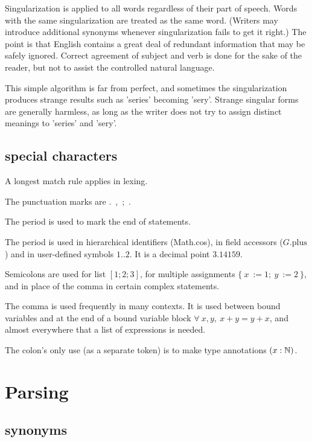 \documentclass[12pt]{article}
\numberwithin{definition}{section}
\begin{document}
Singularization is applied to all words regardless of their part of
speech.  Words with the same singularization are treated as the same
word.  (Writers may introduce additional synonyms whenever
singularization fails to get it right.)  The point is that English
contains a great deal of redundant information that may be safely
ignored.  Correct agreement of subject and verb is done for the sake
of the reader, but not to assist the controlled natural language.

This simple algorithm is far from perfect, and sometimes the
singularization produces strange results such as 'series' becoming
'sery'.  Strange singular forms are generally harmless, as long as the
writer does not try to assign distinct meanings to 'series' and
'sery'.




\subsection{special characters}

A longest match rule applies in lexing.  

The punctuation marks are .\ ,\ ;\ .

The period is used to mark the end of statements.  

The period is used in hierarchical
identifiers (Math.cos), in field accessors ($G.\text{plus}$)
and in user-defined symbols $1..2$.  It is a decimal point $3.14159$.

Semicolons are used for list $[1;2;3]$, for multiple assignments 
$\{\ x\ := 1;\ y\ := 2\ \}$, and in place of the comma in certain complex statements.

The comma is used frequently in many contexts.  It is used between
bound variables and at the end of a bound variable block $\forall\ x,y,\ x + y = y + x$, 
and almost everywhere that a list of expressions is needed.



The colon's only use (as a separate token) is to make type annotations $(x : {\mathbb N})$.


\section{Parsing}

\subsection{synonyms}
\end{document}
